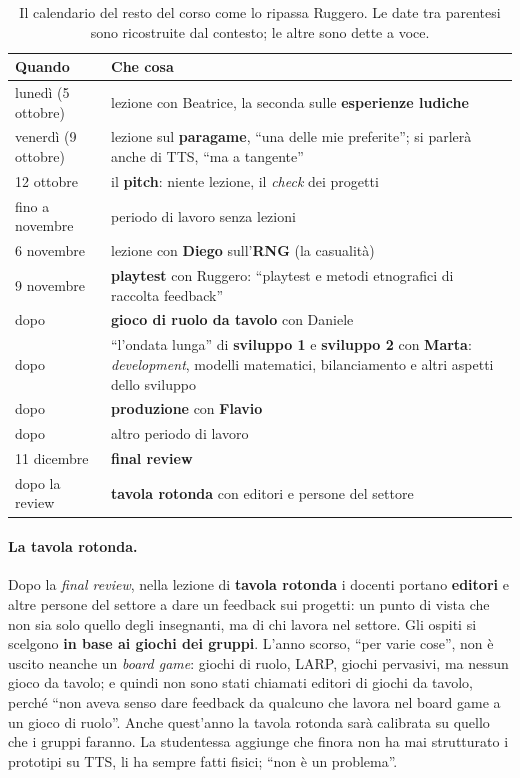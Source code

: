 \begin{table}[htbp]
\centering
\small
\begin{tabular}{@{}p{3.0cm}p{9.6cm}@{}}
\toprule
\textbf{Quando} & \textbf{Che cosa} \\
\midrule
lunedì (5 ottobre) & lezione con Beatrice, la seconda sulle \textbf{esperienze
ludiche} \\
venerdì (9 ottobre) & lezione sul \textbf{paragame}\protect\footnotemark, ``una delle
mie preferite''; si parlerà anche di TTS, ``ma a tangente'' \\
12 ottobre & il \textbf{pitch}: niente lezione, il \emph{check} dei progetti \\
fino a novembre & periodo di lavoro senza lezioni \\
6 novembre & lezione con \textbf{Diego} sull'\textbf{RNG} (la casualità) \\
9 novembre & \textbf{playtest} con Ruggero: ``playtest e metodi etnografici di raccolta
feedback'' \\
dopo & \textbf{gioco di ruolo da tavolo} con Daniele \\
dopo & ``l'ondata lunga'' di \textbf{sviluppo 1} e \textbf{sviluppo 2} con
\textbf{Marta}: \emph{development}, modelli matematici, bilanciamento e altri aspetti
dello sviluppo \\
dopo & \textbf{produzione} con \textbf{Flavio} \\
dopo & altro periodo di lavoro \\
11 dicembre & \textbf{final review} \\
dopo la review & \textbf{tavola rotonda} con editori e persone del settore \\
\bottomrule
\end{tabular}
\caption{Il calendario del resto del corso come lo ripassa Ruggero. Le date tra
parentesi sono ricostruite dal contesto; le altre sono dette a voce.}
\label{a8:tab:calendario}
\end{table}

\paragraph{La tavola rotonda.} Dopo la \emph{final review}, nella lezione di
\textbf{tavola rotonda} i docenti portano \textbf{editori} e altre persone del settore
a dare un feedback sui progetti: un punto di vista che non sia solo quello degli
insegnanti, ma di chi lavora nel settore. Gli ospiti si scelgono \textbf{in base ai
giochi dei gruppi}. L'anno scorso, ``per varie cose'', non è uscito neanche un
\emph{board game}: giochi di ruolo, LARP, giochi pervasivi, ma nessun gioco da tavolo; e
quindi non sono stati chiamati editori di giochi da tavolo, perché ``non aveva senso
dare feedback da qualcuno che lavora nel board game a un gioco di ruolo''. Anche
quest'anno la tavola rotonda sarà calibrata su quello che i gruppi faranno. La
studentessa aggiunge che finora non ha mai strutturato i prototipi su TTS, li ha sempre
fatti fisici; ``non è un problema''.

